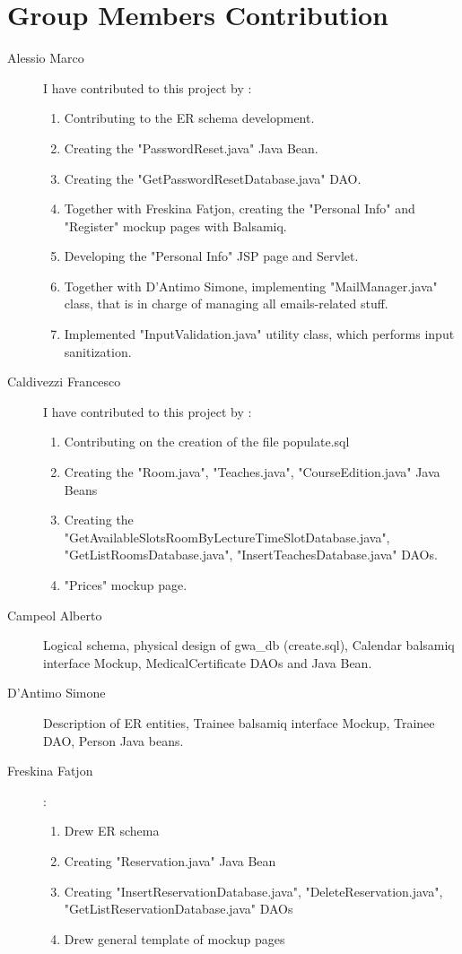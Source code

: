\section{Group Members Contribution}


\begin{description}
	\item[Alessio Marco] I have contributed to this project by :
    	\begin{enumerate}
    	    \item Contributing to the ER schema development.
    	    \item Creating the "PasswordReset.java" Java Bean.
    	    \item Creating the "GetPasswordResetDatabase.java" DAO.
    	    \item Together with Freskina Fatjon, creating the "Personal Info" and "Register" mockup pages with Balsamiq.
    	    \item Developing the "Personal Info" JSP page and Servlet.
    	    \item Together with D'Antimo Simone, implementing "MailManager.java" class, that is in charge of managing all emails-related stuff.
    	    \item Implemented "InputValidation.java" utility class, which performs input sanitization.
    	\end{enumerate}
	\item[Caldivezzi Francesco] I have contributed to this project by :
	\begin{enumerate}
		\item Contributing on the creation of the file populate.sql
		\item Creating the "Room.java", "Teaches.java", "CourseEdition.java" Java Beans
		\item Creating the "GetAvailableSlotsRoomByLectureTimeSlotDatabase.java", "GetListRoomsDatabase.java", "InsertTeachesDatabase.java" DAOs.
		\item "Prices" mockup page.		
	\end{enumerate}
	\item[Campeol Alberto] Logical schema, physical design of gwa\_db (create.sql), Calendar balsamiq interface Mockup, MedicalCertificate DAOs and Java Bean.
	\item[D'Antimo Simone] Description of ER entities, Trainee balsamiq interface Mockup, Trainee DAO, Person Java beans.
	\item[Freskina Fatjon] :
	\begin{enumerate}
		\item Drew ER schema 
		\item Creating "Reservation.java" Java Bean 
		\item Creating "InsertReservationDatabase.java", "DeleteReservation.java", "GetListReservationDatabase.java" DAOs
		\item Drew general template of mockup pages 
	\end{enumerate} 


\end{description}
